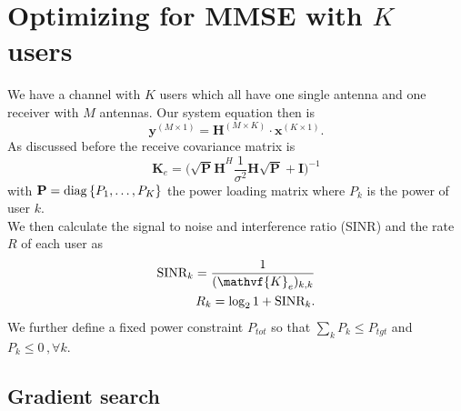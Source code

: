 \section{Optimizing for MMSE with $K$ users}

We have a channel with $K$ users which all have one single antenna and one receiver with $M$ antennas. Our system equation then is 
\begin{equation}
	\mathbf{y}^{(M\times 1)} = \mathbf{H}^{(M\times K)}\cdot \mathbf{x}^{(K\times 1)}.
\end{equation}
As discussed before the receive covariance matrix is 
\begin{equation}
	\mathbf{K}_e = \Biggr(\mathbf{\sqrt{P}H}^H\frac{1}{\sigma^2}\mathbf{H\sqrt{P}}+\mathbf{I}\Biggl)^{-1}
\end{equation}
with $\mathbf{P} = \mathrm{diag}\left\lbrace P_1,\dots,P_K\right\rbrace$ the power loading matrix where $P_k$ is the power of user $k$.\\
We then calculate the signal to noise and interference ratio (SINR) and the rate $R$ of each user as
\begin{align}
	\text{SINR}_k = \frac{1}{(\mathvf{K}_e)_{k,k}}\\
	R_k = \log_2{1+\text{SINR}_k}.
\end{align}
We further define a fixed power constraint $P_{tot}$ so that $ \sum_k{P_k} \leq P_{tgt}$ and $P_k\leq 0\,,\forall k$. 

\subsection{Gradient search}

